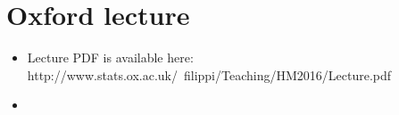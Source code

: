 \documentclass{article}
\begin{document}
\section{Oxford lecture}
\begin{itemize}
    \item Lecture PDF is available here: http://www.stats.ox.ac.uk/~filippi/Teaching/HM2016/Lecture.pdf
    \item
\end{itemize}
\end{document}
